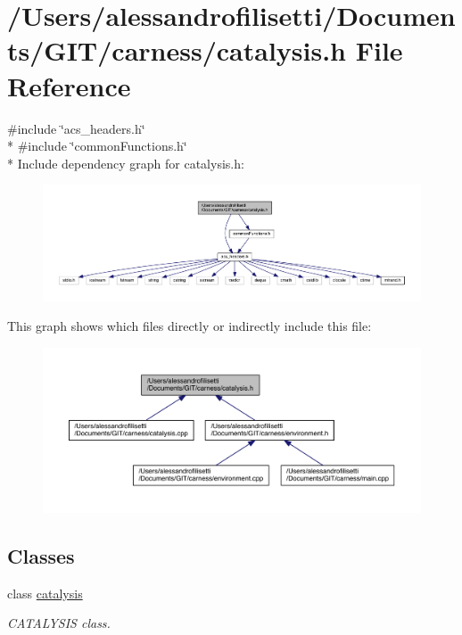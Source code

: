 \hypertarget{a00074}{\section{/\-Users/alessandrofilisetti/\-Documents/\-G\-I\-T/carness/catalysis.h File Reference}
\label{a00074}
}
{\ttfamily \#include \char`\"{}acs\-\_\-headers.\-h\char`\"{}}\\*
{\ttfamily \#include \char`\"{}common\-Functions.\-h\char`\"{}}\\*
Include dependency graph for catalysis.\-h\-:\nopagebreak
\begin{figure}[H]
\begin{center}
\leavevmode
\includegraphics[width=350pt]{a00127}
\end{center}
\end{figure}
This graph shows which files directly or indirectly include this file\-:\nopagebreak
\begin{figure}[H]
\begin{center}
\leavevmode
\includegraphics[width=350pt]{a00128}
\end{center}
\end{figure}
\subsection*{Classes}
\begin{DoxyCompactItemize}
\item 
class \hyperlink{a00012}{catalysis}
\begin{DoxyCompactList}\small\item\em C\-A\-T\-A\-L\-Y\-S\-I\-S class. \end{DoxyCompactList}\end{DoxyCompactItemize}
